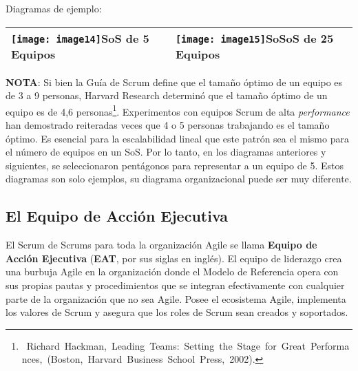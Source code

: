 \documentclass{article} %
\begin{document}
\noindent 

\noindent Diagramas de ejemplo: 

\noindent 

\begin{tabular}{|p{2.1in}|p{2.1in}|} \hline 
\texttt{[image: image14]}\newline SoS de 5 Equipos & \texttt{[image: image15]}\newline SoSoS de 25 Equipos \\ \hline 
\end{tabular}



\noindent \textbf{NOTA}: Si bien la Gu\'{i}a de Scrum define que el tama\~{n}o \'{o}ptimo de un equipo es de 3 a 9 personas, Harvard Research determin\'{o} que el tama\~{n}o \'{o}ptimo de un equipo es de 4,6 personas\footnote{\ Richard\ Hackman,\ Leading\ Teams:\ Setting\ the\ Stage\ for\ Great\ Performances,\ (Boston,\ Harvard\ Business\ School\ Press,\ 2002).}. Experimentos con equipos Scrum de alta \textit{performance }han demostrado reiteradas veces que 4 o 5 personas trabajando es el tama\~{n}o \'{o}ptimo. Es esencial para la escalabilidad lineal que este patr\'{o}n sea el mismo para el n\'{u}mero de equipos en un SoS. Por lo tanto, en los diagramas anteriores y siguientes, se seleccionaron pent\'{a}gonos para representar a un equipo de 5. Estos diagramas son solo ejemplos, su diagrama organizacional puede ser muy diferente.

\noindent 
\subsection{El Equipo de Acci\'{o}n Ejecutiva }

\noindent 

\noindent El Scrum de Scrums para toda la organizaci\'{o}n Agile se llama \textbf{Equipo de Acci\'{o}n Ejecutiva  }(\textbf{EAT}, por sus siglas en ingl\'{e}s). El equipo de liderazgo crea una burbuja Agile en la organizaci\'{o}n donde el Modelo de Referencia opera con sus propias pautas y procedimientos que se integran efectivamente con cualquier parte de la organizaci\'{o}n que no sea Agile. Posee el ecosistema Agile, implementa los valores de Scrum y asegura que los roles de Scrum sean creados y soportados.

\noindent 
\end{document}
